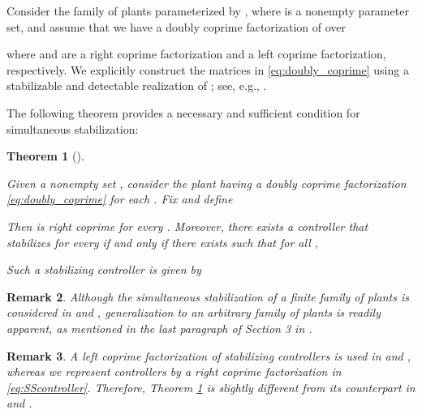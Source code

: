 \documentclass[letterpaper, 12pt, draftcls, onecolumn]{ieeeconf}
\newtheorem{theorem}{Theorem}[section]
\newtheorem{remark}[theorem]{Remark}
\begin{document}
Consider the family of plants  
parameterized by , 
where  is a nonempty parameter set,
and assume that we have a doubly coprime factorization of 
 over  

where  and 
 are
a right coprime factorization and a left coprime factorization,
respectively.
We explicitly construct the matrices in \eqref{eq:doubly_coprime} using
a stabilizable and detectable realization of ;
see, e.g.,
\cite[Theorem 4.2.1]{vidyasagar1985}.

The following theorem provides a necessary and sufficient condition 
for simultaneous stabilization:
\begin{theorem}[\hspace{-0.001pt}\cite{Vidyasagar1982, vidyasagar1985}]
	\label{thm:SS_CM}
	{\it
Given a nonempty set , consider the plant  
		having a doubly coprime factorization \eqref{eq:doubly_coprime} 
		for each .
		Fix  and define
		
		Then  is right coprime for every
		. Moreover, 
		there exists a controller that stabilizes 
		 for every  if and only if
		there exists  such that
		for all ,
		
		Such a stabilizing controller is given by
		
	}
\end{theorem}




\begin{remark}
		Although the simultaneous stabilization of a {\em finite} family of plants is considered in
		\cite[Sec. 5.4]{vidyasagar1985} and 
		\cite{Vidyasagar1982},
		generalization to an {\em arbitrary} family of plants is readily apparent,
		as mentioned in the last paragraph of Section 3 in \cite{Vidyasagar1982}.
\end{remark}
\begin{remark}
		A {\em left} coprime factorization of stabilizing controllers
		is used in 
		\cite[Sec. 5.4]{vidyasagar1985} and 
		\cite{Vidyasagar1982},
		whereas we represent controllers by a {\em right} coprime 
		factorization in \eqref{eq:SScontroller}.
		Therefore, Theorem \ref{thm:SS_CM} is slightly different
		from its counterpart in 
		\cite[Sec. 5.4]{vidyasagar1985} and
		\cite{Vidyasagar1982}.
\end{remark}
\end{document}
